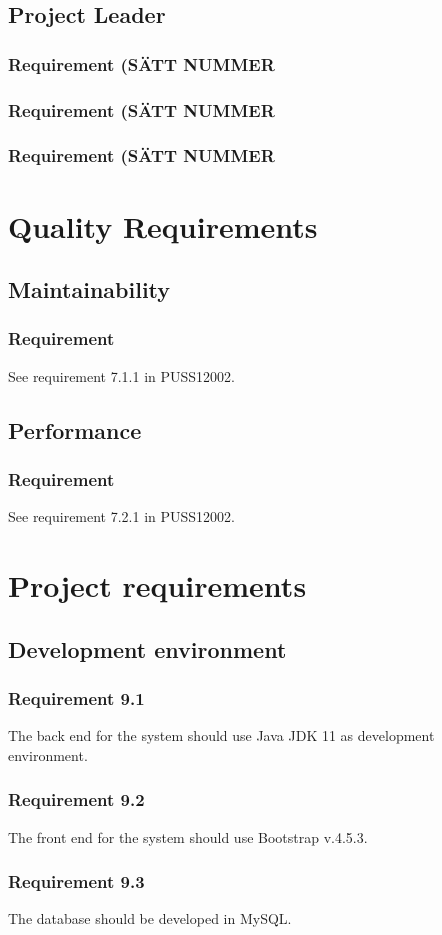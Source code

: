 \documentclass{article}
\begin{document}
\subsection{Project Leader}
\subsubsection{Requirement (SÄTT NUMMER}
\subsubsection{Requirement (SÄTT NUMMER}
\subsubsection{Requirement (SÄTT NUMMER}



\section{Quality Requirements}
\subsection{Maintainability}
\subsubsection{Requirement}
See requirement 7.1.1 in PUSS12002.
\subsection{Performance}
\subsubsection{Requirement}
See requirement 7.2.1 in PUSS12002.




\section{Project requirements}
\subsection{Development environment}
\subsubsection{Requirement 9.1}
The back end for the system should use Java JDK 11 as development environment.

\subsubsection{Requirement 9.2}
The front end for the system should use Bootstrap v.4.5.3.

\subsubsection{Requirement 9.3}
The database should be developed in MySQL.
\end{document}
